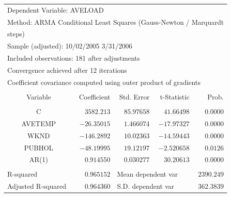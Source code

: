 \documentclass[12pt]{report}
\begin{document}
\begin{table}[H]
	\centering
	\begin{tabular}{lrrrr}
		\multicolumn{3}{l}{Dependent Variable: AVELOAD}&\multicolumn{1}{c}{}&\multicolumn{1}{c}{}\\
		\multicolumn{5}{l}{Method: ARMA Conditional Least Squares (Gauss-Newton / Marquardt}\\
		\multicolumn{2}{l}{steps)}&\multicolumn{1}{c}{}&\multicolumn{1}{c}{}&\multicolumn{1}{c}{}\\
		\multicolumn{4}{l}{Sample (adjusted): 10/02/2005 3/31/2006}&\multicolumn{1}{c}{}\\
		\multicolumn{5}{l}{Included observations: 181 after adjustments}\\
		\multicolumn{5}{l}{Convergence achieved after 12 iterations}\\
		\multicolumn{5}{l}{Coefficient covariance computed using outer product of gradients}\\
		[4.5pt] \hline \\ [-4.5pt]
		\multicolumn{1}{c}{Variable}&\multicolumn{1}{r}{Coefficient}&\multicolumn{1}{r}{Std. Error}&\multicolumn{1}{r}{t-Statistic}&\multicolumn{1}{r}{Prob.}\\
		[4.5pt] \hline \\ [-4.5pt]
		\multicolumn{1}{c}{C}&\multicolumn{1}{r}{$3582.213$}&\multicolumn{1}{r}{$85.97658$}&\multicolumn{1}{r}{$41.66498$}&\multicolumn{1}{r}{$0.0000$}\\
		\multicolumn{1}{c}{AVETEMP}&\multicolumn{1}{r}{$-26.35015$}&\multicolumn{1}{r}{$1.466074$}&\multicolumn{1}{r}{$-17.97327$}&\multicolumn{1}{r}{$0.0000$}\\
		\multicolumn{1}{c}{WKND}&\multicolumn{1}{r}{$-146.2892$}&\multicolumn{1}{r}{$10.02363$}&\multicolumn{1}{r}{$-14.59443$}&\multicolumn{1}{r}{$0.0000$}\\
		\multicolumn{1}{c}{PUBHOL}&\multicolumn{1}{r}{$-48.19995$}&\multicolumn{1}{r}{$19.12197$}&\multicolumn{1}{r}{$-2.520658$}&\multicolumn{1}{r}{$0.0126$}\\
		\multicolumn{1}{c}{AR(1)}&\multicolumn{1}{r}{$0.914550$}&\multicolumn{1}{r}{$0.030277$}&\multicolumn{1}{r}{$30.20613$}&\multicolumn{1}{r}{$0.0000$}\\
		[4.5pt] \hline \\ [-4.5pt]
		\multicolumn{1}{l}{R-squared}&\multicolumn{1}{r}{$0.965152$}&\multicolumn{2}{l}{Mean dependent var}&\multicolumn{1}{r}{$2390.249$}\\
		\multicolumn{1}{l}{Adjusted R-squared}&\multicolumn{1}{r}{$0.964360$}&\multicolumn{2}{l}{S.D. dependent var}&\multicolumn{1}{r}{$362.3839$}\\

\end{tabular}
\end{table}
\end{document}
